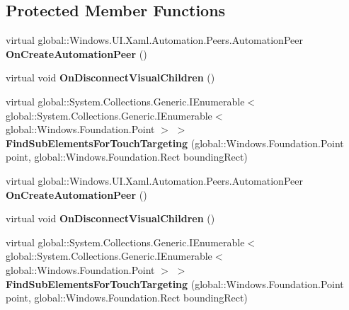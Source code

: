 \subsection*{Protected Member Functions}
\begin{DoxyCompactItemize}
\item 
\mbox{\label{class_windows_1_1_u_i_1_1_xaml_1_1_u_i_element_a97f2f4d73cda61ba80c255fd0ba6fa23}} 
virtual global\+::\+Windows.\+U\+I.\+Xaml.\+Automation.\+Peers.\+Automation\+Peer {\bfseries On\+Create\+Automation\+Peer} ()
\item 
\mbox{\label{class_windows_1_1_u_i_1_1_xaml_1_1_u_i_element_a044b9e7fd69b9591b9342e63f4414a7f}} 
virtual void {\bfseries On\+Disconnect\+Visual\+Children} ()
\item 
\mbox{\label{class_windows_1_1_u_i_1_1_xaml_1_1_u_i_element_a706c639a70707ea7a264a54ff755ff5c}} 
virtual global\+::\+System.\+Collections.\+Generic.\+I\+Enumerable$<$ global\+::\+System.\+Collections.\+Generic.\+I\+Enumerable$<$ global\+::\+Windows.\+Foundation.\+Point $>$ $>$ {\bfseries Find\+Sub\+Elements\+For\+Touch\+Targeting} (global\+::\+Windows.\+Foundation.\+Point point, global\+::\+Windows.\+Foundation.\+Rect bounding\+Rect)
\item 
\mbox{\label{class_windows_1_1_u_i_1_1_xaml_1_1_u_i_element_a97f2f4d73cda61ba80c255fd0ba6fa23}} 
virtual global\+::\+Windows.\+U\+I.\+Xaml.\+Automation.\+Peers.\+Automation\+Peer {\bfseries On\+Create\+Automation\+Peer} ()
\item 
\mbox{\label{class_windows_1_1_u_i_1_1_xaml_1_1_u_i_element_a044b9e7fd69b9591b9342e63f4414a7f}} 
virtual void {\bfseries On\+Disconnect\+Visual\+Children} ()
\item 
\mbox{\label{class_windows_1_1_u_i_1_1_xaml_1_1_u_i_element_a706c639a70707ea7a264a54ff755ff5c}} 
virtual global\+::\+System.\+Collections.\+Generic.\+I\+Enumerable$<$ global\+::\+System.\+Collections.\+Generic.\+I\+Enumerable$<$ global\+::\+Windows.\+Foundation.\+Point $>$ $>$ {\bfseries Find\+Sub\+Elements\+For\+Touch\+Targeting} (global\+::\+Windows.\+Foundation.\+Point point, global\+::\+Windows.\+Foundation.\+Rect bounding\+Rect)

\end{DoxyCompactItemize}
